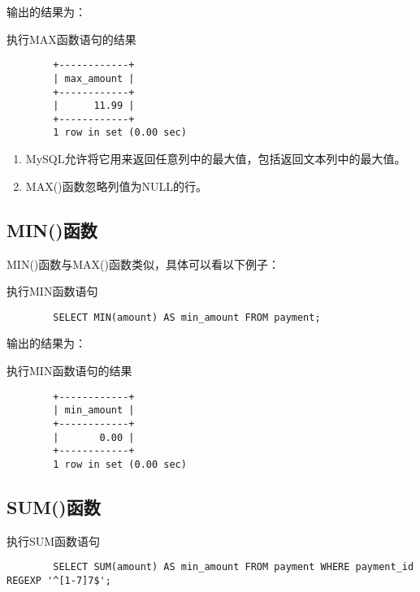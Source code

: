 \documentclass[UTF8]{article}
\begin{document}
输出的结果为：

\begin{listing}[H]
	\caption{执行MAX函数语句的结果}
	\label{code:maxfunctionclauseresult}
\begin{verbatim}
        +------------+
        | max_amount |
        +------------+
        |      11.99 |
        +------------+
        1 row in set (0.00 sec)
\end{verbatim}
\end{listing}

\begin{orangebox}[frametitle={Tips 12.3.1 MAX()函数注意事项}]
\begin{enumerate}
        \item MySQL允许将它用来返回任意列中的最大值，包括返回文本列中的最大值。
        \item MAX()函数忽略列值为NULL的行。
\end{enumerate}    
\end{orangebox}

\subsection{MIN()函数}

MIN()函数与MAX()函数类似，具体可以看以下例子：

\begin{listing}[H]
	\caption{执行MIN函数语句}
	\label{code:minfunctionclause}
\begin{verbatim}
        SELECT MIN(amount) AS min_amount FROM payment;      
\end{verbatim}
\end{listing}

输出的结果为：

\begin{listing}[H]
	\caption{执行MIN函数语句的结果}
	\label{code:minfunctionclauseresult}
\begin{verbatim}
        +------------+
        | min_amount |
        +------------+
        |       0.00 |
        +------------+
        1 row in set (0.00 sec)
\end{verbatim}
\end{listing}


\subsection{SUM()函数}

\begin{listing}[H]
	\caption{执行SUM函数语句}
	\label{code:sumfunctionclause}
\begin{verbatim}
        SELECT SUM(amount) AS min_amount FROM payment WHERE payment_id REGEXP '^[1-7]7$';     
\end{verbatim}
\end{listing}
\end{document}
